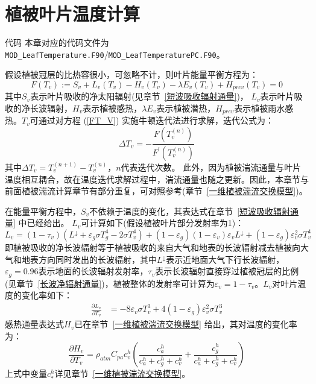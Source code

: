 \chapter{植被叶片温度计算}\label{植被叶片温度计算}
\begin{mymdframed}{代码}
本章对应的代码文件为\texttt{MOD\_LeafTemperature.F90}/\texttt{MOD\_LeafTemperaturePC.F90}。
\end{mymdframed}

假设植被冠层的比热容很小，可忽略不计，则叶片能量平衡方程为：
\begin{equation}\label{FT_V}
F\left(T_{v}\right):=S_{v}+L_{v}\left(T_{v}\right)-H_{v}\left(T_{v}\right)-\lambda E_{v}\left(T_{v}\right)+H_{p r c v}\left(T_{v}\right)=0
\end{equation}
其中$S_v$表示叶片吸收的净太阳辐射(见章节~\ref{短波吸收辐射通量})，
$L_v$表示叶片吸收的净长波辐射，$H_v$表示植被感热，$\lambda E_v$表示植被潜热，$H_{prev}$表示植被雨水感热。$T_v$可通过对方程 (\ref{FT_V}) 实施牛顿迭代法进行求解，迭代公式为：
\begin{equation}
\Delta T_{v}=-\frac{F\left(T_{v}^{(n)}\right)}{F^{\prime}\left(T_{v}^{(n)}\right)}
\end{equation}
其中$\Delta T_v=T_v^{\left(n+1\right)}-T_v^{\left(n\right)}$，$n$代表迭代次数。
此外，因为植被湍流通量与叶片温度相互耦合，故在温度迭代求解过程中，湍流通量也随之更新。因此，本章节与前面植被湍流计算章节有部分重复，可对照参考(章节~\ref{一维植被湍流交换模型})。

在能量平衡方程中，$S_v$不依赖于温度的变化，其表达式在章节~\ref{短波吸收辐射通量} 中已经给出。
$L_v$可计算如下(假设植被叶片部分发射率为1)：
\begin{equation}
L_{v}=\left(1-\tau_{v}\right)\left(L ^\downarrow+\varepsilon_{g} \sigma T_{g}^{4}-2 \sigma T_{v}^{4}\right) + \left( 1- \varepsilon_{g} \right )\left(1-\varepsilon_{v} \right)\varepsilon_{v} L^\downarrow + \left( 1- \varepsilon_{g} \right ) \varepsilon_{v}^2 \sigma T_{v}^4
\end{equation}
即植被吸收的净长波辐射等于植被吸收的来自大气和地表的长波辐射减去植被向大气和地表方向同时发出的长波辐射，其中$L^\downarrow$表示近地面大气下行长波辐射，$\varepsilon_g=0.96$表示地面的长波辐射发射率，$\tau_{v}$表示长波辐射直接穿过植被冠层的比例(见章节~\ref{长波净辐射通量})，植被整体的发射率可计算为$\varepsilon_v=1-\tau_v$。$L_v$对叶片温度的变化率如下：
\begin{equation}
\begin{aligned}
 \frac{\partial L_{v}}{\partial T_{v}} &= -8 \varepsilon_{v}\sigma T_{v}^{3} + 4 \left( 1- \varepsilon_{g} \right ) \varepsilon_{v}^2 \sigma T_{v}^3
\end{aligned}
\end{equation}
感热通量表达式$H_{v}$已在章节~\ref{一维植被湍流交换模型} 给出，其对温度的变化率为：
\begin{equation}
\frac{\partial H_{v}}{\partial T_{v}}=\rho_{atm} C_{pa} c_{v}^{h} \left( \frac{c_{a}^{h}}{c_{a}^{h} + c_{g}^{h} + c_{v}^{h}} + \frac{c_{g}^{h}}{c_{a}^{h} + c_{g}^{h} + c_{v}^{h}} \right)
\end{equation}
上式中变量$c_*^h$详见章节~\ref{一维植被湍流交换模型}。

